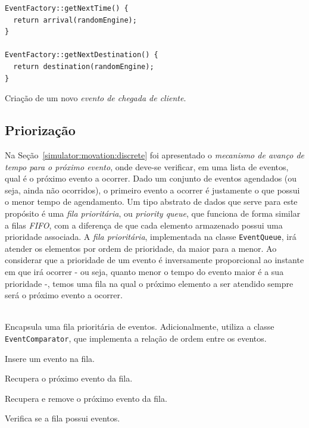 \begin{description}
\begin{algorithm}[htb!]
\begin{verbatim}
EventFactory::getNextTime() {
  return arrival(randomEngine);
}

EventFactory::getNextDestination() {
  return destination(randomEngine);
}
        \end{verbatim}
      \caption{\label{alg:eventcreation}Criação de um novo \textit{evento de chegada de cliente}.}
    \end{algorithm}
\end{description}

\subsection{Priorização} \label{model:queue}

Na Seção~\ref{simulator:movation:discrete} foi apresentado o \textit{mecanismo
de avanço de tempo para o próximo evento}, onde deve-se verificar, em uma lista
de eventos, qual é o próximo evento a ocorrer. Dado um conjunto de eventos
agendados (ou seja, ainda não ocorridos), o primeiro evento a ocorrer é
justamente o que possui o menor tempo de agendamento. Um tipo abstrato de dados
que serve para este propósito é uma \textit{fila prioritária}, ou
\textit{priority queue}, que funciona de forma similar a filas \textit{FIFO},
com a diferença de que cada elemento armazenado possui uma prioridade associada.
A \textit{fila prioritária}, implementada na classe \texttt{EventQueue}, irá
atender os elementos por ordem de prioridade, da maior para a menor. Ao
considerar que a prioridade de um evento é inversamente proporcional ao instante
em que irá ocorrer - ou seja, quanto menor o tempo do evento maior é a sua
prioridade -, temos uma fila na qual o próximo elemento a ser atendido sempre
será o próximo evento a ocorrer.

\begin{description}\setlength\itemsep{0mm}
  \item[EventQueue] \hfill \\
    Encapsula uma fila prioritária de eventos. Adicionalmente, utiliza a classe
    \texttt{EventComparator}, que implementa a relação de ordem entre os
    eventos.

    \begin{description}[leftmargin=!,labelwidth=\widthof{\bfseries hasNextEvent}]\setlength\itemsep{0mm}
      \item[\texttt{push}] Insere um evento na fila.
      \item[\texttt{top}] Recupera o próximo evento da fila.
      \item[\texttt{pop}] Recupera e remove o próximo evento da fila.
      \item[\texttt{hasNextEvent}] Verifica se a fila possui eventos.
    \end{description}
\end{description}

